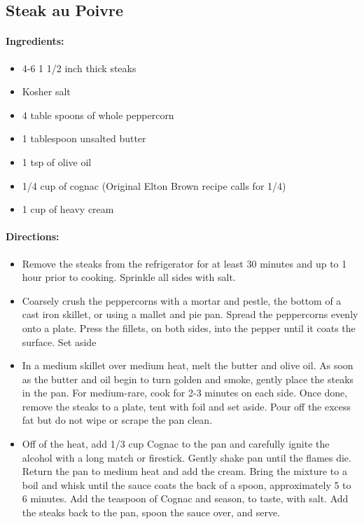 \documentclass{article}
\begin{document}
\subsection{Steak au Poivre}

\paragraph{Ingredients:}
\begin{itemize}
    \item 4-6 1 1/2 inch thick steaks
    \item Kosher salt
    \item 4 table spoons of whole peppercorn
    \item 1 tablespoon unsalted butter
    \item 1 tsp of olive oil
    \item 1/4 cup of cognac (Original Elton Brown recipe calls for 1/4)
    \item 1 cup of heavy cream
\end{itemize}

\paragraph{Directions:}
\begin{itemize}
    \item Remove the steaks from the refrigerator for at least 30 minutes and up to 1 hour prior to cooking. Sprinkle all sides with salt.
    \item Coarsely crush the peppercorns with a mortar and pestle, the bottom of a cast iron skillet, or using a mallet and pie pan. Spread the peppercorns evenly onto a plate. Press the fillets, on both sides, into the pepper until it coats the surface. Set aside
    \item In a medium skillet over medium heat, melt the butter and olive oil. As soon as the butter and oil begin to turn golden and smoke, gently place the steaks in the pan. For medium-rare, cook for 2-3 minutes on each side. Once done, remove the steaks to a plate, tent with foil and set aside. Pour off the excess fat but do not wipe or scrape the pan clean.
    \item Off of the heat, add 1/3 cup Cognac to the pan and carefully ignite the alcohol with a long match or firestick. Gently shake pan until the flames die. Return the pan to medium heat and add the cream. Bring the mixture to a boil and whisk until the sauce coats the back of a spoon, approximately 5 to 6 minutes. Add the teaspoon of Cognac and season, to taste, with salt. Add the steaks back to the pan, spoon the sauce over, and serve.
\end{itemize}
\end{document}

